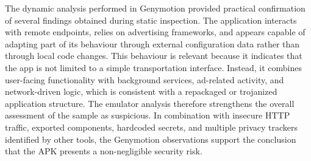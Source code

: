 The dynamic analysis performed in Genymotion provided practical confirmation of several findings obtained during static inspection. The application interacts with remote endpoints, relies on advertising frameworks, and appears capable of adapting part of its behaviour through external configuration data rather than through local code changes.
This behaviour is relevant because it indicates that the app is not limited to a simple transportation interface. Instead, it combines user-facing functionality with background services, ad-related activity, and network-driven logic, which is consistent with a repackaged or trojanized application structure.
The emulator analysis therefore strengthens the overall assessment of the sample as suspicious. In combination with insecure HTTP traffic, exported components, hardcoded secrets, and multiple privacy trackers identified by other tools, the Genymotion observations support the conclusion that the APK presents a non-negligible security risk.

